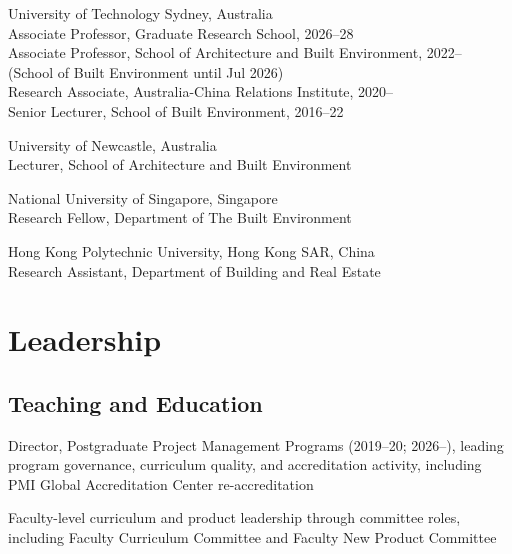 \documentclass[11pt,a4paper]{report} %
\newcommand{\listitemspace}{0.25em}
\renewenvironment{itemize}
{\begin{list}{}{\setlength{\leftmargin}{0em}
                \setlength{\parskip}{0em}
                \setlength{\itemsep}{\listitemspace}
                \setlength{\parsep}{\listitemspace}}}
{\end{list}}
\begin{document}
    \begin{tablist}

        \item[2016--]   \tab{}University of Technology Sydney, Australia \\
                              Associate Professor, Graduate Research School, 2026--28 \\
                              Associate Professor, School of Architecture and Built Environment, 2022-- \\
                              (School of Built Environment until Jul 2026) \\
                              Research Associate, Australia-China Relations Institute, 2020-- \\
                              Senior Lecturer, School of Built Environment, 2016--22

        \item[2013--16]   \tab{}University of Newcastle, Australia \\
                              Lecturer, School of Architecture and Built Environment

        \item[2010--13] \tab{}National University of Singapore, Singapore \\
                              Research Fellow, Department of The Built Environment

        \item[2007--08] \tab{}Hong Kong Polytechnic University, Hong Kong SAR, China \\
                              Research Assistant, Department of Building and Real Estate

    \end{tablist}



    \section*{Leadership}

    \subsection*{Teaching and Education}
    
    \begin{itemize}
    
        \item Director, Postgraduate Project Management Programs (2019--20; 2026--), leading program governance, curriculum quality, and accreditation activity, including PMI Global Accreditation Center re-accreditation
        
        \item Faculty-level curriculum and product leadership through committee roles, including Faculty Curriculum Committee and Faculty New Product Committee
        
    \end{itemize}
    
\end{document}
